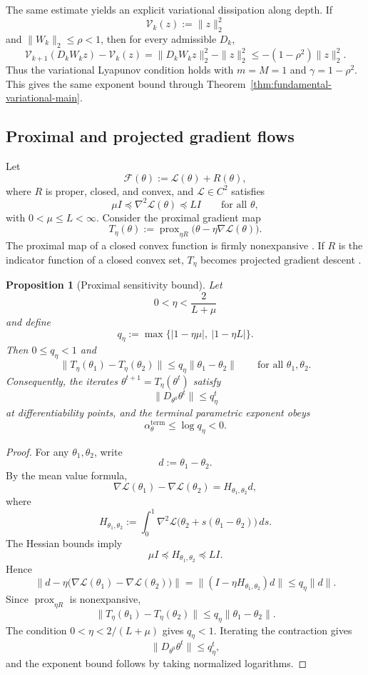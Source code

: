 \documentclass{article}
\newtheorem{proposition}[theorem]{Proposition}
\numberwithin{equation}{section}
\begin{document}
The same estimate yields an explicit variational dissipation along depth. If
\[
\mathcal{V}_k(z):=\|z\|_2^2
\]
and \(\|W_k\|_2\le\rho<1\), then for every admissible \(D_k\),
\[
\mathcal{V}_{k+1}(D_kW_kz)-\mathcal{V}_k(z)
=
\|D_kW_kz\|_2^2-\|z\|_2^2
\le
-(1-\rho^2)\|z\|_2^2 .
\]
Thus the variational Lyapunov condition holds with \(m=M=1\) and
\(\gamma=1-\rho^2\). This gives the same exponent bound through
Theorem~\ref{thm:fundamental-variational-main}.

\subsection{Proximal and projected gradient flows}
\label{subsec:proximal-projected-example}

Let
\[
\mathcal{F}(\theta):=\mathcal{L}(\theta)+R(\theta),
\]
where \(R\) is proper, closed, and convex, and \(\mathcal{L}\in C^2\) satisfies
\[
\mu I\preceq \nabla^2\mathcal{L}(\theta)\preceq LI
\qquad
\text{for all }\theta ,
\]
with \(0<\mu\le L<\infty\). Consider the proximal gradient map
\[
T_\eta(\theta)
:=
\operatorname{prox}_{\eta R}
\bigl(\theta-\eta\nabla\mathcal{L}(\theta)\bigr).
\]
The proximal map of a closed convex function is firmly nonexpansive
\cite{BauschkeCombettes2011}. If \(R\) is the indicator function of a closed
convex set, \(T_\eta\) becomes projected gradient descent
\cite{RockafellarWets1998}.

\begin{proposition}[Proximal sensitivity bound]
\label{prop:proximal-sensitivity-bound}
Let
\[
0<\eta<\frac{2}{L+\mu}
\]
and define
\[
q_\eta
:=
\max\{|1-\eta\mu|,\ |1-\eta L|\}.
\]
Then \(0\le q_\eta<1\) and
\[
\|T_\eta(\theta_1)-T_\eta(\theta_2)\|
\le
q_\eta\|\theta_1-\theta_2\|
\qquad
\text{for all }\theta_1,\theta_2 .
\]
Consequently, the iterates \(\theta^{t+1}=T_\eta(\theta^t)\) satisfy
\[
\|D_{\theta^0}\theta^t\|
\le
q_\eta^t
\]
at differentiability points, and the terminal parametric exponent obeys
\[
\alpha_\theta^{\mathrm{term}}
\le
\log q_\eta<0 .
\]
\end{proposition}

\begin{proof}
For any \(\theta_1,\theta_2\), write
\[
d:=\theta_1-\theta_2 .
\]
By the mean value formula,
\[
\nabla\mathcal{L}(\theta_1)-\nabla\mathcal{L}(\theta_2)
=
H_{\theta_1,\theta_2}d,
\]
where
\[
H_{\theta_1,\theta_2}
:=
\int_0^1
\nabla^2\mathcal{L}\bigl(\theta_2+s(\theta_1-\theta_2)\bigr)\,ds .
\]
The Hessian bounds imply
\[
\mu I\preceq H_{\theta_1,\theta_2}\preceq LI .
\]
Hence
\[
\left\|
d-\eta\bigl(\nabla\mathcal{L}(\theta_1)-\nabla\mathcal{L}(\theta_2)\bigr)
\right\|
=
\|(I-\eta H_{\theta_1,\theta_2})d\|
\le
q_\eta\|d\|.
\]
Since \(\operatorname{prox}_{\eta R}\) is nonexpansive,
\[
\|T_\eta(\theta_1)-T_\eta(\theta_2)\|
\le
q_\eta\|\theta_1-\theta_2\|.
\]
The condition \(0<\eta<2/(L+\mu)\) gives \(q_\eta<1\). Iterating the contraction
gives
\[
\|D_{\theta^0}\theta^t\|
\le
q_\eta^t ,
\]
and the exponent bound follows by taking normalized logarithms.
\end{proof}
\end{document}
